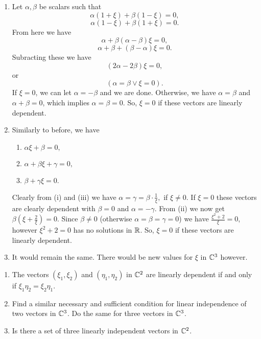 \begin{solution}
  \begin{enumerate}[label=(\alph*)]
    \item Let $\alpha, \beta$ be scalars such that
      \[\alpha(1 + \xi) + \beta(1 - \xi) = 0,\]
      \[\alpha(1 - \xi) + \beta(1 + \xi) = 0.\]
      From here we have
      \[\alpha + \beta (\alpha - \beta)\xi = 0,\]
      \[\alpha + \beta + (\beta - \alpha)\xi = 0.\]
      Subracting these we have
      \[(2\alpha - 2\beta)\xi = 0,\]
      or
      \[(\alpha = \beta \vee \xi = 0).\]
      If $\xi = 0$, we can let $\alpha = -\beta$ and we are done.
      Otherwise, we have $\alpha = \beta$ and $\alpha + \beta = 0$, which implies $\alpha = \beta = 0$.
      So, $\xi = 0$ if these vectors are linearly dependent.
    \item Similarly to before, we have
      \begin {enumerate}[label=(\roman*)]
        \item $\alpha\xi + \beta = 0,$
        \item $\alpha + \beta\xi + \gamma = 0,$
        \item $\beta + \gamma\xi = 0.$
      \end{enumerate}
      Clearly from (i) and (iii) we have $\alpha = \gamma = \beta \cdot \frac{1}{\xi},$ if $\xi \neq 0$.
      If $\xi = 0$ these vectors are clearly dependent with $\beta = 0$ and $\alpha = -\gamma$.
      From (ii) we now get $\beta(\xi + \frac{2}{\xi}) = 0$.
      Since $\beta \neq 0$ (otherwise $\alpha = \beta = \gamma = 0$) we have $\frac{\xi^2 + 2}{\xi} = 0$, however $\xi^2 + 2 = 0$ has no solutions in $\mathbb{R}$.
      So, $\xi = 0$ if these vectors are linearly dependent.
    \item It would remain the same.
      There would be new values for $\xi$ in $\mathbb{C}^3$ however.
  \end{enumerate}
\end{solution}

\begin{problem}
  \begin{enumerate}[label=(\alph*)]
    \item The vectors $(\xi_1, \xi_2)$ and $(\eta_1, \eta_2)$ in $\mathbb{C}^2$ are linearly dependent if and only if $\xi_1\eta_2 = \xi_2\eta_1$.
    \item Find a similar necessary and sufficient condition for linear independence of two vectors in $\mathbb{C}^3$.
      Do the same for three vectors in $\mathbb{C}^3$.
    \item Is there a set of three linearly independent vectors in $\mathbb{C}^2$.
  \end{enumerate}
\end{problem}

